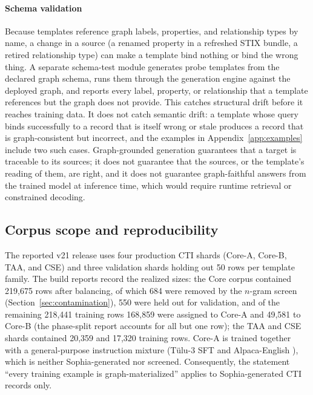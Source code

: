 \documentclass[twocolumn]{svjour3}
\begin{document}
\paragraph{Schema validation}
Because templates reference graph labels, properties, and relationship types by name, a change in a source (a renamed property in a refreshed STIX bundle, a retired relationship type) can make a template bind nothing or bind the wrong thing. A separate schema-test module generates probe templates from the declared graph schema, runs them through the generation engine against the deployed graph, and reports every label, property, or relationship that a template references but the graph does not provide. This catches structural drift before it reaches training data. It does not catch semantic drift: a template whose query binds successfully to a record that is itself wrong or stale produces a record that is graph-consistent but incorrect, and the examples in Appendix~\ref{app:examples} include two such cases. Graph-grounded generation guarantees that a target is traceable to its sources; it does not guarantee that the sources, or the template's reading of them, are right, and it does not guarantee graph-faithful answers from the trained model at inference time, which would require runtime retrieval or constrained decoding.

\subsection{Corpus scope and reproducibility}\label{sec:corpus}
The reported v21 release uses four production CTI shards (Core-A, Core-B, TAA, and CSE) and three validation shards holding out 50 rows per template family. The build reports record the realized sizes: the Core corpus contained 219,675 rows after balancing, of which 684 were removed by the $n$-gram screen (Section~\ref{sec:contamination}), 550 were held out for validation, and of the remaining 218,441 training rows 168,859 were assigned to Core-A and 49,581 to Core-B (the phase-split report accounts for all but one row); the TAA and CSE shards contained 20,359 and 17,320 training rows. Core-A is trained together with a general-purpose instruction mixture (T\"ulu-3 SFT and Alpaca-English \cite{lambert2024tulu3,taori2023alpaca}), which is neither Sophia-generated nor screened. Consequently, the statement ``every training example is graph-materialized'' applies to Sophia-generated CTI records only.
\end{document}
